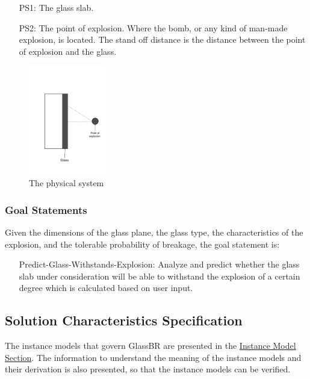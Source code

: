 \documentclass[12pt]{article}
\begin{document}
\begin{itemize}
\item[PS1:]{The glass slab.}
\item[PS2:]{The point of explosion. Where the bomb, or any kind of man-made explosion, is located. The stand off distance is the distance between the point of explosion and the glass.}
\end{itemize}
\begin{figure}
\begin{center}
\includegraphics[width=0.3\textwidth]{../../../../datafiles/glassbr/physicalsystimage.png}
\caption{The physical system}
\label{Figure:physSystImage}
\end{center}
\end{figure}
\subsubsection{Goal Statements}
\label{Sec:GoalStmt}
Given the dimensions of the glass plane, the glass type, the characteristics of the explosion, and the tolerable probability of breakage, the goal statement is:

\begin{itemize}
\item[Predict-Glass-Withstands-Explosion:\phantomsection\label{willBreakGS}]{Analyze and predict whether the glass slab under consideration will be able to withstand the explosion of a certain degree which is calculated based on user input.}
\end{itemize}
\subsection{Solution Characteristics Specification}
\label{Sec:SolCharSpec}
The instance models that govern GlassBR are presented in the \hyperref[Sec:IMs]{Instance Model Section}. The information to understand the meaning of the instance models and their derivation is also presented, so that the instance models can be verified.
\end{document}
